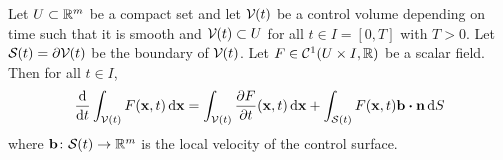 \begin{theorem}
	Let $U \subset \mathbb{R}^m$ be a compact set and let $\mathcal{V}_{}(t)$ be a control volume depending on time such that it is smooth and $\mathcal{V}_{}(t) \subset U$ for all $t \in I = [0, T]$ with $T > 0$. Let $\mathcal{S}_{}(t) = \partial \mathcal{V}_{}(t)$ be the boundary of $\mathcal{V}_{}(t)$. Let $F \in \mathcal{C}^1(U \times I, \mathbb{R})$ be a scalar field. Then for all $t \in I$,
	\begin{equation}
		\frac{\dd}{\dd{t}} \int_{\cv{}(t)} F(\vb{x}, t) \dd{\vb{x}} = 
		\int_{\cv{}(t)} \frac{\partial F}{\partial t} (\vb{x}, t) \dd{\vb{x}} + 
		\int_{\cs{}(t)} F(\vb{x}, t) \vb{b} \vdot \vb{n} \dd{S}
	\end{equation}
	where $\vb{b} \colon \mathcal{S}_{}(t) \rightarrow \mathbb{R}^m$ is the local velocity of the control surface.
\end{theorem}
